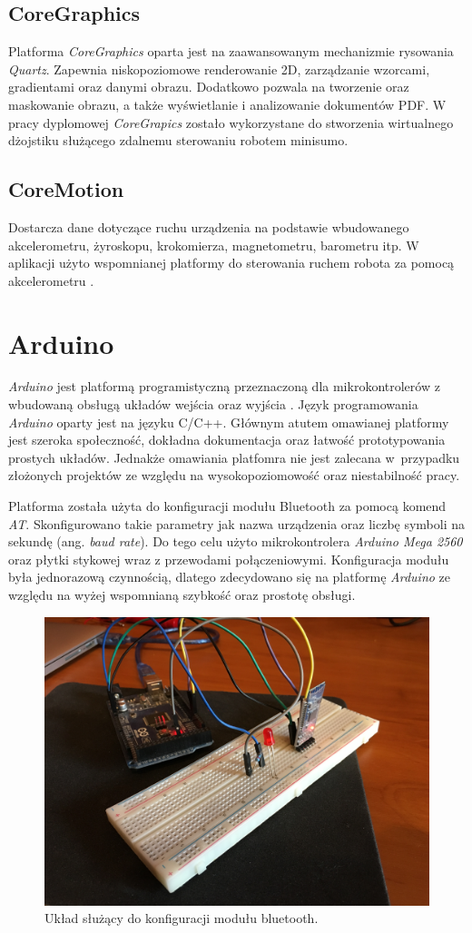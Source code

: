 \subsection{CoreGraphics}
Platforma \textit{CoreGraphics} oparta jest na zaawansowanym mechanizmie rysowania \textit{Quartz}. Zapewnia niskopoziomowe renderowanie 2D, zarządzanie wzorcami, gradientami oraz danymi obrazu. Dodatkowo pozwala na tworzenie oraz maskowanie obrazu, a także wyświetlanie i analizowanie dokumentów PDF. W pracy dyplomowej \textit{CoreGrapics} zostało wykorzystane do stworzenia wirtualnego dżojstiku służącego zdalnemu sterowaniu robotem minisumo. 

\subsection{CoreMotion}
Dostarcza dane dotyczące ruchu urządzenia na podstawie wbudowanego akcelerometru, żyroskopu, krokomierza, magnetometru, barometru itp. W aplikacji użyto wspomnianej platformy do sterowania ruchem robota za pomocą akcelerometru \cite{AppleDocumentation}.

\section{Arduino}
\textit{Arduino} jest platformą programistyczną przeznaczoną dla mikrokontrolerów z wbudowaną obsługą układów wejścia oraz wyjścia \cite{Arduino}. Język programowania \textit{Arduino} oparty jest na języku C/C++. Głównym atutem omawianej platformy jest szeroka społeczność, dokładna dokumentacja oraz łatwość prototypowania prostych układów. Jednakże omawiania platfomra nie jest zalecana w~przypadku złożonych projektów ze względu na wysokopoziomowość oraz niestabilność pracy.

Platforma została użyta do konfiguracji modułu Bluetooth za pomocą komend \textit{AT}. Skonfigurowano takie parametry jak nazwa urządzenia oraz liczbę symboli na sekundę (ang. \textit{baud rate}). Do tego celu użyto mikrokontrolera \textit{Arduino Mega 2560} oraz płytki stykowej wraz z przewodami połączeniowymi. Konfiguracja modułu była jednorazową czynnością, dlatego zdecydowano się na platformę \textit{Arduino} ze względu na wyżej wspomnianą szybkość oraz prostotę obsługi.
  

\begin{figure}[H]
	\centering
		\includegraphics[width=0.75\linewidth]{pic02/arduino.JPG}
	\caption{Układ służący do konfiguracji modułu bluetooth.}
	\label{fig:arduino}	
\end{figure}

